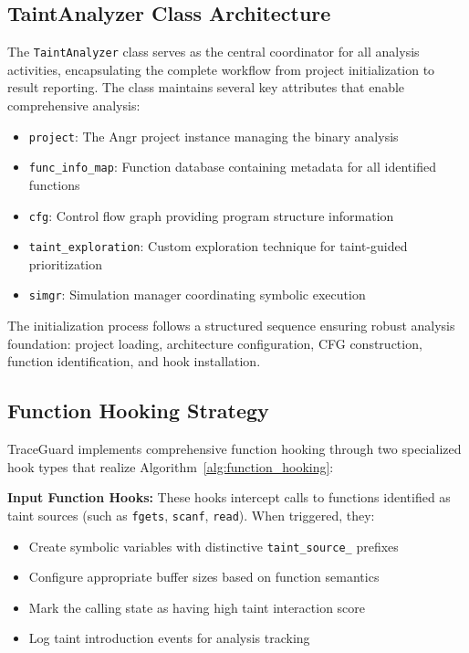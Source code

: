 \subsection{TaintAnalyzer Class Architecture}

The \texttt{TaintAnalyzer} class serves as the central coordinator for all analysis activities, encapsulating the complete workflow from project initialization to result reporting. The class maintains several key attributes that enable comprehensive analysis:

\begin{itemize}
    \item \texttt{project}: The Angr project instance managing the binary analysis
    \item \texttt{func\_info\_map}: Function database containing metadata for all identified functions
    \item \texttt{cfg}: Control flow graph providing program structure information
    \item \texttt{taint\_exploration}: Custom exploration technique for taint-guided prioritization
    \item \texttt{simgr}: Simulation manager coordinating symbolic execution
\end{itemize}

The initialization process follows a structured sequence ensuring robust analysis foundation: project loading, architecture configuration, CFG construction, function identification, and hook installation.

\subsection{Function Hooking Strategy}

TraceGuard implements comprehensive function hooking through two specialized hook types that realize Algorithm~\ref{alg:function_hooking}:

\textbf{Input Function Hooks:} These hooks intercept calls to functions identified as taint sources (such as \texttt{fgets}, \texttt{scanf}, \texttt{read}). When triggered, they:
\begin{itemize}
    \item Create symbolic variables with distinctive \texttt{taint\_source\_} prefixes
    \item Configure appropriate buffer sizes based on function semantics
    \item Mark the calling state as having high taint interaction score
    \item Log taint introduction events for analysis tracking
\end{itemize}

